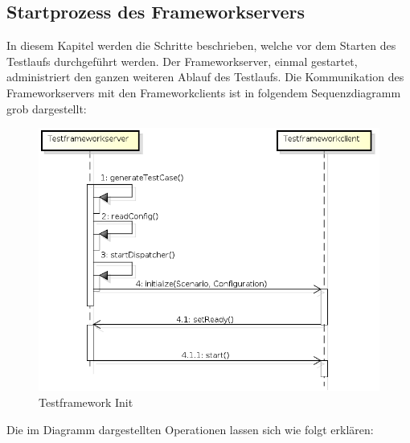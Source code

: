 \subsection{Startprozess des Frameworkservers}
\label{sec:startFramework}
In diesem Kapitel werden die Schritte beschrieben, welche vor dem Starten des Testlaufs durchgeführt werden. Der Frameworkserver, einmal gestartet, administriert den ganzen weiteren Ablauf des Testlaufs. \newline
Die Kommunikation des Frameworkservers mit den Frameworkclients ist in folgendem Sequenzdiagramm grob dargestellt:


\begin{figure}[H]
\begin{center}
\includegraphics[scale=0.6]{image_testFramework/TestFWInit.png}
\end{center}
\caption{Testframework Init}
\end{figure}

Die im Diagramm dargestellten Operationen lassen sich wie folgt erklären:

